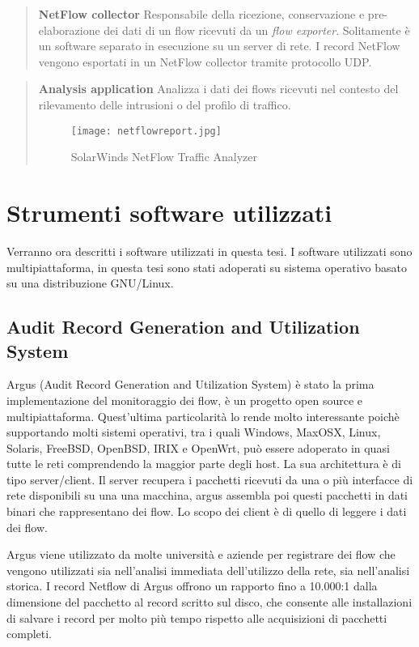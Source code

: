 \documentclass[../main.tex]{subfiles}
\begin{document}
\begin{verse}
\textbf{NetFlow collector}
Responsabile della ricezione, conservazione e pre-elaborazione dei dati di un flow ricevuti da un \textit{flow exporter}. Solitamente è un software separato in esecuzione su un server di rete. I record NetFlow vengono esportati in un NetFlow collector tramite protocollo UDP.
\end{verse}

\begin{verse}
\textbf{Analysis application} 
Analizza i dati dei flows ricevuti nel contesto del rilevamento delle intrusioni o del profilo di traffico.

\begin{figure}[H]
\centering
\texttt{[image: netflowreport.jpg]}
\caption{SolarWinds NetFlow Traffic Analyzer}
\end{figure}
\end{verse}


\section{Strumenti software utilizzati}
Verranno ora descritti i software utilizzati in questa tesi. I software utilizzati sono multipiattaforma, in questa tesi sono stati adoperati su sistema operativo basato su una distribuzione GNU/Linux.

\subsection{Audit Record Generation and Utilization System}
Argus (Audit Record Generation and Utilization System) è stato la prima implementazione del monitoraggio dei flow, è un progetto open source e multipiattaforma.
Quest'ultima particolarità lo rende molto interessante poichè supportando molti sistemi operativi, tra i quali Windows, MaxOSX, Linux, Solaris, FreeBSD, OpenBSD, IRIX e OpenWrt, può essere adoperato in quasi tutte le reti comprendendo la maggior parte degli host. La sua architettura è di tipo server/client. Il server recupera i pacchetti ricevuti da una o più interfacce di rete disponibili su una una macchina, argus assembla poi questi pacchetti in dati binari che rappresentano dei flow. Lo scopo dei client è di quello di leggere i dati dei flow. \newline

Argus viene utilizzato da molte università e aziende per registrare dei flow che vengono utilizzati sia nell'analisi immediata dell'utilizzo della rete, sia nell'analisi storica.
I record Netflow di Argus offrono un rapporto fino a 10.000:1 dalla dimensione del pacchetto al record scritto sul disco, che consente alle installazioni di salvare i record per molto più tempo rispetto alle acquisizioni di pacchetti completi. \newline
\end{document}
